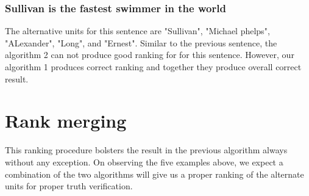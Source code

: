 \documentclass[11pt]{article}
\begin{document}
\subsubsection{Sullivan is the fastest swimmer in the world}
The alternative units for this sentence are "Sullivan", "Michael phelps", "ALexander", "Long", and "Ernest". Similar to the previous sentence, the algorithm 2 can not produce good ranking for for this sentence. However, our algorithm 1 produces correct ranking and together they produce overall correct result.

\section{Rank merging}
This ranking procedure bolsters the result in the previous algorithm always without any exception. On observing the five examples above, we expect a combination of the two algorithms will give us a proper ranking of the alternate units for proper truth verification.
















\end{document}
